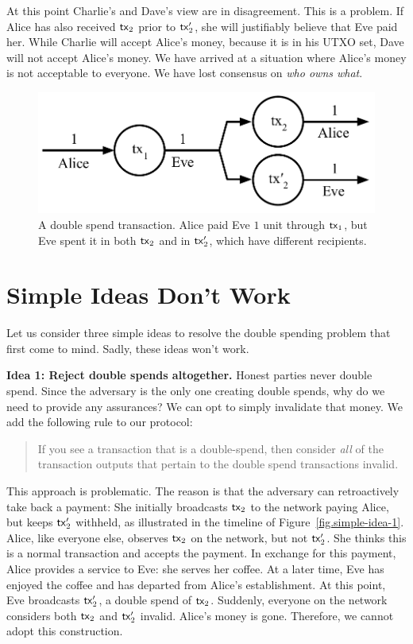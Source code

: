 At this point Charlie's and Dave's view are in disagreement. This is a problem. If Alice has
also received $\mathsf{tx}_2$ prior to $\mathsf{tx}_2'$, she will justifiably believe that Eve paid her.
While Charlie will accept Alice's money, because it is in his UTXO set, Dave will not accept
Alice's money. We have arrived at a situation where Alice's money is not acceptable to everyone.
We have lost consensus on \emph{who owns what}.

\begin{figure}[h]
    \centering
    \includegraphics[width=0.6 \columnwidth,keepaspectratio]{figures/double-spend.pdf}
    \caption{A double spend transaction. Alice paid Eve $1$ unit through $\mathsf{tx}_1$, but Eve spent it in both $\mathsf{tx}_2$ and in $\mathsf{tx}_2'$,
             which have different recipients.}
    \label{fig.double-spend}
\end{figure}

\section{Simple Ideas Don't Work}

Let us consider three simple ideas to resolve the double spending problem that first come to mind.
Sadly, these ideas won't work.

\noindent
\textbf{Idea 1: Reject double spends altogether.} Honest parties never double spend. Since the adversary is the only one
creating double spends, why do we need to provide any assurances? We can opt to simply invalidate that
money. We add the following rule to our protocol:

\begin{quote}
If you see a transaction that is a double-spend,
then consider \emph{all} of the transaction outputs that pertain to the double spend transactions invalid.
\end{quote}

This approach is problematic. The reason is that the adversary can retroactively take back
a payment: She initially broadcasts $\mathsf{tx}_2$ to the network paying Alice, but keeps $\mathsf{tx}_2'$ withheld,
as illustrated in the timeline of Figure~\ref{fig.simple-idea-1}.
Alice, like everyone else, observes $\mathsf{tx}_2$ on the network, but not $\mathsf{tx}_2'$. She thinks this is
a normal transaction and accepts the payment. In exchange for this payment, Alice provides a service
to Eve: she serves her coffee. At a later time, Eve has enjoyed the coffee and has departed from Alice's
establishment. At this point, Eve broadcasts $\mathsf{tx}_2'$, a double spend of $\mathsf{tx}_2$. Suddenly, everyone
on the network considers both $\mathsf{tx}_2$ and $\mathsf{tx}_2'$ invalid. Alice's money is gone. Therefore, we cannot
adopt this construction.

